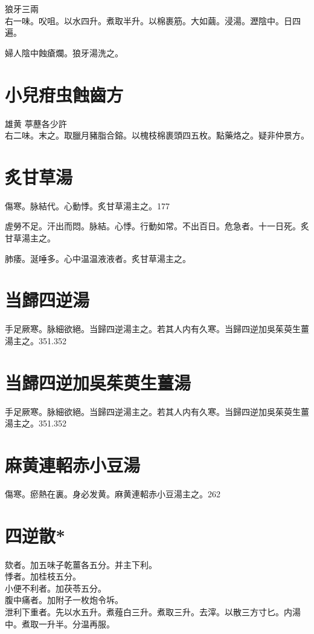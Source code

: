 狼牙{\scriptsize 三兩}\\
右一味。㕮咀。以水四升。煮取半升。以棉裹筋。大如繭。浸湯。瀝陰中。日四遍。

{\khaaitp 婦人}陰中蝕瘡爛。狼牙湯洗之。

\section{小兒疳虫蝕齒方}

雄黄 葶藶{\scriptsize 各少許}\\
右二味。末之。取臘月豬脂合鎔。以槐枝棉裹頭四五枚。點藥烙之。{\scriptsize 疑非仲景方。}

\section{炙甘草湯}

傷寒。脉結代。心動悸。炙甘草湯主之。177

虗勞不足。汗出而悶。脉結。心悸。行動如常。不出百日。危急者。十一日死。炙甘草湯主之。

肺痿。涎唾多。心中温温液液者。炙甘草湯主之。

\section{当歸四逆湯}

手足厥寒。脉細欲絕。当歸四逆湯主之。若其人内有久寒。当歸四逆加吳茱萸生薑湯主之。351.352

\section{当歸四逆加吳茱萸生薑湯}

手足厥寒。脉細欲絕。当歸四逆湯主之。若其人内有久寒。当歸四逆加吳茱萸生薑湯主之。351.352

\section{麻黄連軺赤小豆湯}

傷寒。瘀熱在裏。身必发黄。麻黄連軺赤小豆湯主之。262

\section{四逆散*}

欬者。加五味子乾薑各五分。并主下利。\\
悸者。加桂枝五分。\\
小便不利者。加茯苓五分。\\
腹中痛者。加附子一枚炮令坼。\\
泄利下重者。先以水五升。煮薤白三升。煮取三升。去滓。以散三方寸匕。内湯中。煮取一升半。分温再服。

